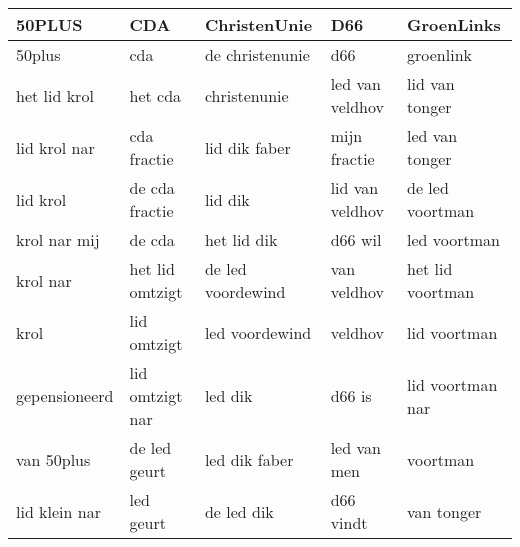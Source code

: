 \begin{tabular}{lllll}
\toprule
        50PLUS &              CDA &       ChristenUnie &              D66 &        GroenLinks \\
\midrule
        50plus &              cda &    de christenunie &              d66 &         groenlink \\
  het lid krol &          het cda &       christenunie &  led van veldhov &    lid van tonger \\
  lid krol nar &      cda fractie &      lid dik faber &     mijn fractie &    led van tonger \\
      lid krol &   de cda fractie &            lid dik &  lid van veldhov &   de led voortman \\
  krol nar mij &           de cda &        het lid dik &          d66 wil &      led voortman \\
      krol nar &  het lid omtzigt &  de led voordewind &      van veldhov &  het lid voortman \\
          krol &      lid omtzigt &     led voordewind &          veldhov &      lid voortman \\
 gepensioneerd &  lid omtzigt nar &            led dik &           d66 is &  lid voortman nar \\
    van 50plus &     de led geurt &      led dik faber &      led van men &          voortman \\
 lid klein nar &        led geurt &         de led dik &        d66 vindt &        van tonger \\
\bottomrule
\end{tabular}
